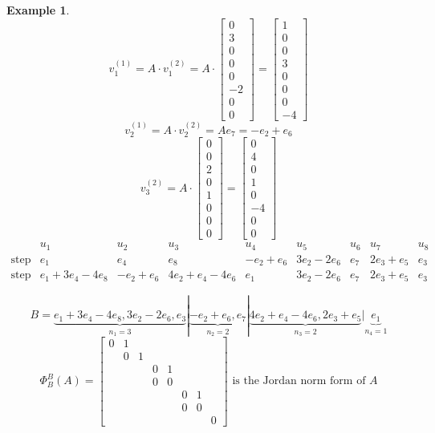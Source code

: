 \documentclass{article}
\newcounter{lecref}[section]
\numberwithin{lecref}{section}
\newtheorem{example}[lecref]{Example}
\begin{document}
\begin{example}
  \[
    v_1^{(1)} = A \cdot v_1^{(2)}
    = A \cdot \begin{bmatrix} 0 \\ 3 \\ 0 \\ 0 \\ 0 \\-2 \\ 0 \\ 0 \end{bmatrix}
    = \begin{bmatrix} 1 \\ 0 \\ 0 \\ 3 \\ 0 \\ 0 \\ 0 \\ -4 \end{bmatrix}
  \] \[
    v_2^{(1)} = A \cdot v_2^{(2)} = A e_7 = -e_2 + e_6
  \] \[
    v_3^{(2)} = A \cdot \begin{bmatrix} 0 \\ 0 \\ 2 \\ 0 \\ 1 \\ 0 \\ 0 \\ 0 \end{bmatrix} = \begin{bmatrix} 0 \\ 4 \\ 0 \\ 1 \\ 0 \\ -4 \\ 0 \\ 0 \end{bmatrix}
  \]
  \begin{align*}
                  & u_1 & u_2 & u_3 & u_4 & u_5 & u_6 & u_7 & u_8 \\
    \text{step 2} & e_1 & e_4 & e_8 & -e_2+e_6 & 3e_2-2e_6 & e_7 & 2e_3+e_5 & e_3 \\
    \text{step 3} & e_1+3e_4-4e_8 & -e_2+e_6 & 4e_2+e_4-4e_6 & e_1 & 3e_2-2e_6 & e_7 & 2e_3+e_5 & e_3
  \end{align*}

  \[
    B = \underbrace{e_1 + 3e_4 - 4e_8, 3e_2 - 2e_6, e_3}_{n_1 = 3} | \underbrace{-e_2+e_6, e_7}_{n_2 = 2} | \underbrace{4e_2 + e_4 - 4e_6, 2e_3 + e_5}_{n_3 = 2} | \underbrace{e_1}_{n_4 = 1}
  \] \[
    \Phi_B^B(A) = \begin{bmatrix}
      0 & 1 &   &   &   &   &   & \\
        & 0 & 1 &   &   &   &   & \\
        &   &   & 0 & 1 &   &   & \\
        &   &   & 0 & 0 &   &   & \\
        &   &   &   &   & 0 & 1 & \\
        &   &   &   &   & 0 & 0 & \\
        &   &   &   &   &   &   & 0
    \end{bmatrix}
    \text{ is the Jordan norm form of } A
  \]
\end{example}
\end{document}
